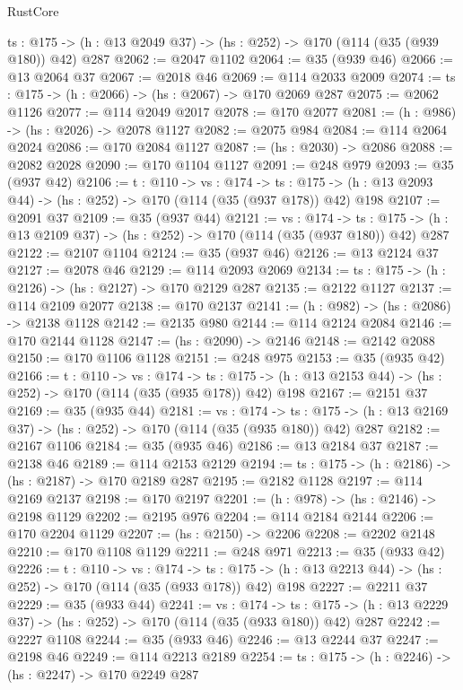 \begin{lexlean}{RustCore}
\begin{coremodule}
  {ts : @175} -> (h : @13 @2049 @37) -> (hs : @252) -> @170 (@114 (@35 (@939 @180)) @42) @287
@2062 := @2047 @1102
@2064 := @35 (@939 @46)
@2066 := @13 @2064 @37
@2067 := @2018 @46
@2069 := @114 @2033 @2009
@2074 := {ts : @175} -> (h : @2066) -> (hs : @2067) -> @170 @2069 @287
@2075 := @2062 @1126
@2077 := @114 @2049 @2017
@2078 := @170 @2077
@2081 := (h : @986) -> (hs : @2026) -> @2078 @1127
@2082 := @2075 @984
@2084 := @114 @2064 @2024
@2086 := @170 @2084 @1127
@2087 := (hs : @2030) -> @2086
@2088 := @2082 @2028
@2090 := @170 @1104 @1127
@2091 := @248 @979
@2093 := @35 (@937 @42)
@2106 := {t : @110} ->
  {vs : @174} ->
  {ts : @175} -> (h : @13 @2093 @44) -> (hs : @252) -> @170 (@114 (@35 (@937 @178)) @42) @198
@2107 := @2091 @37
@2109 := @35 (@937 @44)
@2121 := {vs : @174} ->
  {ts : @175} -> (h : @13 @2109 @37) -> (hs : @252) -> @170 (@114 (@35 (@937 @180)) @42) @287
@2122 := @2107 @1104
@2124 := @35 (@937 @46)
@2126 := @13 @2124 @37
@2127 := @2078 @46
@2129 := @114 @2093 @2069
@2134 := {ts : @175} -> (h : @2126) -> (hs : @2127) -> @170 @2129 @287
@2135 := @2122 @1127
@2137 := @114 @2109 @2077
@2138 := @170 @2137
@2141 := (h : @982) -> (hs : @2086) -> @2138 @1128
@2142 := @2135 @980
@2144 := @114 @2124 @2084
@2146 := @170 @2144 @1128
@2147 := (hs : @2090) -> @2146
@2148 := @2142 @2088
@2150 := @170 @1106 @1128
@2151 := @248 @975
@2153 := @35 (@935 @42)
@2166 := {t : @110} ->
  {vs : @174} ->
  {ts : @175} -> (h : @13 @2153 @44) -> (hs : @252) -> @170 (@114 (@35 (@935 @178)) @42) @198
@2167 := @2151 @37
@2169 := @35 (@935 @44)
@2181 := {vs : @174} ->
  {ts : @175} -> (h : @13 @2169 @37) -> (hs : @252) -> @170 (@114 (@35 (@935 @180)) @42) @287
@2182 := @2167 @1106
@2184 := @35 (@935 @46)
@2186 := @13 @2184 @37
@2187 := @2138 @46
@2189 := @114 @2153 @2129
@2194 := {ts : @175} -> (h : @2186) -> (hs : @2187) -> @170 @2189 @287
@2195 := @2182 @1128
@2197 := @114 @2169 @2137
@2198 := @170 @2197
@2201 := (h : @978) -> (hs : @2146) -> @2198 @1129
@2202 := @2195 @976
@2204 := @114 @2184 @2144
@2206 := @170 @2204 @1129
@2207 := (hs : @2150) -> @2206
@2208 := @2202 @2148
@2210 := @170 @1108 @1129
@2211 := @248 @971
@2213 := @35 (@933 @42)
@2226 := {t : @110} ->
  {vs : @174} ->
  {ts : @175} -> (h : @13 @2213 @44) -> (hs : @252) -> @170 (@114 (@35 (@933 @178)) @42) @198
@2227 := @2211 @37
@2229 := @35 (@933 @44)
@2241 := {vs : @174} ->
  {ts : @175} -> (h : @13 @2229 @37) -> (hs : @252) -> @170 (@114 (@35 (@933 @180)) @42) @287
@2242 := @2227 @1108
@2244 := @35 (@933 @46)
@2246 := @13 @2244 @37
@2247 := @2198 @46
@2249 := @114 @2213 @2189
@2254 := {ts : @175} -> (h : @2246) -> (hs : @2247) -> @170 @2249 @287

\end{coremodule}
\end{lexlean}
